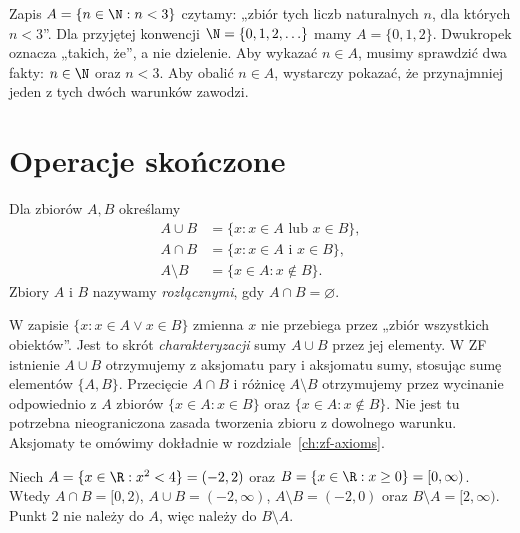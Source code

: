 \begin{przyklad}
Zapis $A=\{n\in\N:n<3\}$ czytamy: „zbiór tych liczb
naturalnych $n$, dla których $n<3$”. Dla przyjętej konwencji
$\N=\{0,1,2,\ldots\}$ mamy $A=\{0,1,2\}$.
Dwukropek oznacza „takich, że”, a nie dzielenie.
Aby wykazać $n\in A$, musimy sprawdzić dwa fakty:
$n\in\N$ oraz $n<3$. Aby obalić $n\in A$, wystarczy
pokazać, że przynajmniej jeden z tych dwóch warunków zawodzi.
\end{przyklad}

\section{Operacje skończone}\label{sec:set-basic-ops}
\begin{definicja}
Dla zbiorów $A,B$ określamy
\begin{align*}
A\cup B&=\{x:x\in A\text{ lub }x\in B\},\\
A\cap B&=\{x:x\in A\text{ i }x\in B\},\\
A\setminus B&=\{x\in A:x\notin B\}.
\end{align*}
Zbiory $A$ i $B$ nazywamy \emph{rozłącznymi}, gdy
$A\cap B=\varnothing$.
\end{definicja}

\begin{uwaga}\label{rem:finite-set-existence-xlii}
W zapisie $\{x:x\in A\lor x\in B\}$ zmienna $x$ nie
przebiega przez „zbiór wszystkich obiektów”. Jest to skrót
\emph{charakteryzacji} sumy $A\cup B$ przez jej elementy.
W ZF istnienie $A\cup B$ otrzymujemy z aksjomatu pary
i aksjomatu sumy, stosując sumę elementów $\{A,B\}$.
Przecięcie $A\cap B$ i różnicę $A\setminus B$ otrzymujemy
przez wycinanie odpowiednio z $A$ zbiorów
$\{x\in A:x\in B\}$ oraz $\{x\in A:x\notin B\}$.
Nie jest tu potrzebna nieograniczona zasada tworzenia zbioru
z dowolnego warunku. Aksjomaty te omówimy dokładnie
w rozdziale~\ref{ch:zf-axioms}.
\end{uwaga}

\begin{przyklad}
Niech $A=\{x\in\R:x^2<4\}=(-2,2)$ oraz
$B=\{x\in\R:x\geq 0\}=[0,\infty)$.
Wtedy $A\cap B=[0,2)$, $A\cup B=(-2,\infty)$,
$A\setminus B=(-2,0)$ oraz $B\setminus A=[2,\infty)$.
Punkt $2$ nie należy do $A$, więc należy do $B\setminus A$.
\end{przyklad}

